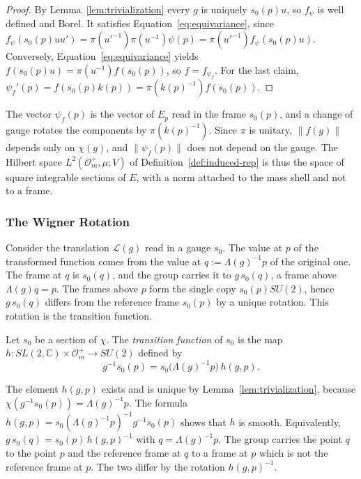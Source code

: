 \begin{proof}
	By Lemma~\ref{lem:trivialization} every $g$ is uniquely $s_0(p)u$, so $f_\psi$ is well defined and Borel. It satisfies Equation~\eqref{eq:equivariance}, since $f_\psi(s_0(p)uu')=\pi(u'^{-1})\pi(u^{-1})\psi(p)=\pi(u'^{-1})f_\psi(s_0(p)u)$. Conversely, Equation~\eqref{eq:equivariance} yields $f(s_0(p)u)=\pi(u^{-1})f(s_0(p))$, so $f=f_{\psi_f}$. For the last claim, $\psi_f'(p)=f(s_0(p)k(p))=\pi(k(p)^{-1})f(s_0(p))$.
\end{proof}

\begin{remark}
	The vector $\psi_f(p)$ is the vector of $E_p$ read in the frame $s_0(p)$, and a change of gauge rotates the components by $\pi(k(p)^{-1})$. Since $\pi$ is unitary, $\|f(g)\|$ depends only on $\chi(g)$, and $\|\psi_f(p)\|$ does not depend on the gauge. The Hilbert space $L^2(\mathcal{O}_m^+,\mu;V)$ of Definition~\ref{def:induced-rep} is thus the space of square integrable sections of $E$, with a norm attached to the mass shell and not to a frame.
\end{remark}

\subsubsection*{The Wigner Rotation}

Consider the translation $\mathcal{L}(g)$ read in a gauge $s_0$. The value at $p$ of the transformed function comes from the value at $q:=\Lambda(g)^{-1}p$ of the original one. The frame at $q$ is $s_0(q)$, and the group carries it to $g\,s_0(q)$, a frame above $\Lambda(g)q=p$. The frames above $p$ form the single copy $s_0(p)SU(2)$, hence $g\,s_0(q)$ differs from the reference frame $s_0(p)$ by a unique rotation. This rotation is the transition function.

\begin{definition}\label{def:transition-function}
	Let $s_0$ be a section of $\chi$. The \emph{transition function} of $s_0$ is the map $h:SL(2,\mathbb{C})\times\mathcal{O}_m^+\to SU(2)$ defined by
	\begin{equation*}
		g^{-1}s_0(p)=s_0\big(\Lambda(g)^{-1}p\big)\,h(g,p).
	\end{equation*}
\end{definition}

\begin{remark}
	The element $h(g,p)$ exists and is unique by Lemma~\ref{lem:trivialization}, because $\chi(g^{-1}s_0(p))=\Lambda(g)^{-1}p$. The formula $h(g,p)=s_0(\Lambda(g)^{-1}p)^{-1}g^{-1}s_0(p)$ shows that $h$ is smooth. Equivalently, $g\,s_0(q)=s_0(p)\,h(g,p)^{-1}$ with $q=\Lambda(g)^{-1}p$. The group carries the point $q$ to the point $p$ and the reference frame at $q$ to a frame at $p$ which is not the reference frame at $p$. The two differ by the rotation $h(g,p)^{-1}$.
\end{remark}

